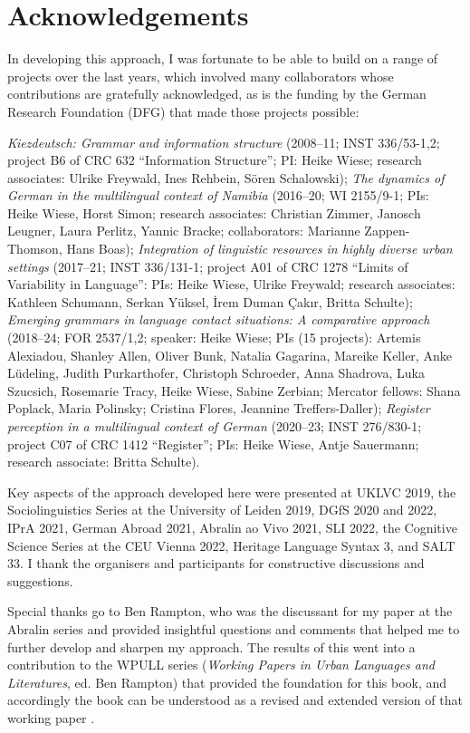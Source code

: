 \chapter{Acknowledgements}
In developing this approach, I was fortunate to be able to build on a range of projects over the last years, which involved many collaborators whose contributions are gratefully acknowledged, as is the funding by the German Research Foundation (DFG) that made those projects possible:

\textit{Kiezdeutsch: Grammar and information structure} (2008–11; INST 336/53-1,2; project B6 of CRC 632 “Information Structure”; PI: Heike Wiese; research associates: Ulrike Freywald, Ines Rehbein, Sören Schalowski); \textit{The dynamics of German in the multilingual context of Namibia} (2016–20; WI 2155/9-1; PIs: Heike Wiese, Horst Simon; research associates: Christian Zimmer, Janosch Leugner, Laura Perlitz, Yannic Bracke; collaborators: Marianne Zappen-Thomson, Hans Boas); \textit{Integration of linguistic resources in highly diverse urban settings} (2017–21; INST 336/131-1; project A01 of
CRC 1278 “Limits of Variability in Language”: PIs: Heike Wiese, Ulrike Freywald; research associates: Kathleen Schumann, Serkan Yüksel, İrem Duman Çakır, Britta Schulte); \textit{Emerging grammars in language contact situations: A comparative approach} (2018–24;
FOR 2537/1,2; speaker: Heike Wiese; PIs (15 projects): Artemis Alexiadou, Shanley Allen, Oliver Bunk, Natalia Gagarina, Mareike Keller, Anke Lüdeling, Judith Purkarthofer, Christoph Schroeder, Anna Shadrova, Luka Szucsich, Rosemarie Tracy, Heike Wiese, Sabine Zerbian; Mercator fellows: Shana Poplack, Maria Polinsky; Cristina Flores, Jeannine Treffers-Daller); \textit{Register perception in a multilingual context of German} (2020–23; INST 276/830-1; project C07 of
CRC 1412 “Register”; PIs: Heike Wiese, Antje Sauermann; research associate: Britta Schulte).

Key aspects of the approach developed here were presented at
UKLVC 2019, the Sociolinguistics Series at the University of
Leiden 2019,
DGfS 2020 and 2022,
IPrA 2021, German Abroad 2021, Abralin ao
Vivo 2021,
SLI 2022, the Cognitive Science Series at the CEU
Vienna 2022, Heritage Language Syntax 3, and SALT 33. I thank the organisers and participants for constructive discussions and suggestions.

Special thanks go to Ben Rampton, who was the discussant for my paper at the Abralin series and provided insightful questions and comments that helped me to further develop and sharpen my approach. The results of this went into a contribution to the WPULL series (\textit{Working Papers in Urban Languages and Literatures}, ed. Ben Rampton) that provided the foundation for this book, and accordingly the book can be understood as a revised and extended version of that working paper \citep{Wiese2021}.

